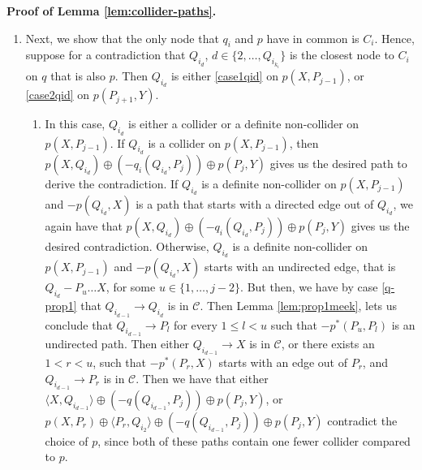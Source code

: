 \documentclass[11pt]{article}
\newcommand{\g}[1][G]{\mathcal{#1}}
\newenvironment{proofofnoqed}[1][]{\noindent \textbf{Proof of #1.}}{}
\begin{document}
\begin{proofofnoqed}[Lemma \ref{lem:collider-paths}]
\begin{enumerate}
        \item[\ref{q-prop2}]
        Next, we show that the only node that $q_i$ and $p$ have in common is $C_i$. Hence, suppose for a contradiction that $Q_{i_d}$, $d \in \{2, \dots, Q_{i_{k_i}}\}$ is the closest node to $C_i$ on $q$ that is also $p$. Then $Q_{i_d}$ is either \ref{case1qid} on $p(X,P_{j-1})$, or \ref{case2qid} on $p(P_{j+1}, Y)$.
        \begin{enumerate}[label = (\alph*)]
            \item\label{case1qid}
            In this case, $Q_{i_d}$ is either a collider or a definite non-collider on $p(X, P_{j-1})$. If $Q_{i_d}$ is a collider on $p(X, P_{j-1})$, then $p(X, Q_{i_d}) \oplus (-q_i( Q_{i_d}, P_{j})) \oplus p(P_{j}, Y)$ gives us the desired path to derive the contradiction. If $Q_{i_d}$ is a definite non-collider on $p(X, P_{j-1})$ and $-p(Q_{i_d}, X)$ is a path that starts with a directed edge out of $Q_{i_d}$, we again have that $p(X, Q_{i_d}) \oplus (-q_i( Q_{i_d}, P_{j})) \oplus p(P_{j}, Y)$ gives us the desired contradiction. Otherwise, $Q_{i_d}$ is a definite non-collider on $p(X, P_{j-1})$ and $-p(Q_{i_d}, X)$ starts with an undirected edge, that is $Q_{i_d} - P_{u} \dots X$, for some $u \in \{1, \dots, j-2\}$. But then, we have  by case \ref{q-prop1} that   $Q_{i_{d-1}} \to Q_{i_d}$ is in $\g[C]$. Then  Lemma \ref{lem:prop1meek}, lets us conclude that $ Q_{i_{d-1}} \to P_{l}$ for every $1 \le l < u$ such that $-p^{*}(P_u, P_l)$ is an undirected path. Then either $ Q_{i_{d-1}} \to X$ is in $\g[C]$, or there exists an $1< r < u$, such that $-p^{*}(P_r, X)$ starts with an edge out of $P_r$, and $ Q_{i_{d-1}} \to P_r$ is in $\g[C].$ Then we have that either $\langle X, Q_{i_{d-1}} \rangle \oplus (-q( Q_{i_{d-1}}, P_{j})) \oplus p(P_{j}, Y)$, or $p(X,P_r) \oplus \langle P_r, Q_{i_2}\rangle \oplus (-q( Q_{i_{d-1}}, P_{j})) \oplus p(P_{j}, Y)$ contradict the choice of $p$, since both of these paths contain one fewer collider compared to $p$.


\end{enumerate}
\end{enumerate}
\end{proofofnoqed}
\end{document}
